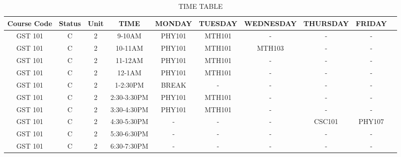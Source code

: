 \documentclass{article}
\begin{document}
	\begin{sidewaystable}[h!]
		\begin{center}
			\caption{TIME TABLE}
			\label{tab:table1}
			\begin{tabular}{|c|c|c|c|c|c|c|c|c|c|}
				\hline
			\rowcolor{blue!15}	
	        \textbf{Course Code} & \textbf{Status} & \textbf{Unit} & \textbf{TIME} & 
	        \cellcolor{green!15} \textbf{MONDAY} & \cellcolor{green!15} \textbf{TUESDAY} & \cellcolor{green!15}\textbf{WEDNESDAY} & \cellcolor{green!15}\textbf{THURSDAY} & \cellcolor{green!15}\textbf{FRIDAY}\\
	        \hline
	       \cellcolor{red!15} GST 101 & C & 2 & 9-10AM & PHY101 & MTH101 & - & - & -\\
	        \cellcolor{red!15}GST 101 & C & 2 & 10-11AM & PHY101 & MTH101 & MTH103 & - & -\\
	       \cellcolor{red!15} GST 101 & C & 2 & 11-12AM & PHY101 & MTH101 & - & - & -\\
	       \cellcolor{red!15} GST 101 & C & 2 & 12-1AM & PHY101 & MTH101 & - & - & -\\
	        \cellcolor{red!15}GST 101 & C & 2 & 1-2:30PM & BREAK & - & - & - & -\\
	      \cellcolor{red!15}  GST 101 & C & 2 & 2:30-3:30PM & PHY101 & MTH101 & - & - & -\\
	       \cellcolor{red!15} GST 101 & C & 2 & 3:30-4:30PM & PHY101 & MTH101 & - & - & -\\
	       \cellcolor{red!15} GST 101 & C & 2 & 4:30-5:30PM & - & - & - & CSC101 & PHY107\\
	       \cellcolor{red!15} GST 101 & C & 2 & 5:30-6:30PM & - & - & - & - & -\\
	      \cellcolor{red!15}  GST 101 & C & 2 & 6:30-7:30PM & - & - & - & - & -\\
	        \hline
			\end{tabular}
		\end{center}
	\end{sidewaystable}
\end{document}
